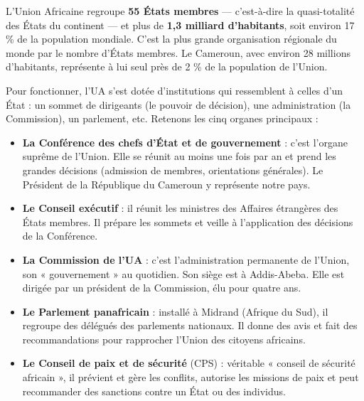 \documentclass[11pt]{article}
\newcommand{\cle}[1]{{\popxbold\color{popdark}#1}}
\newcounter{popsec}
\newcounter{popsub}
\newcommand{\courssub}[1]{%
  \stepcounter{popsub}%
  \par\vspace{9pt}\noindent{\popxbold\fontsize{11.5}{13}\selectfont\color{popink}{\color{poporange}\thepopsec.\thepopsub}\hspace{6pt}#1}\par\nopagebreak\vspace{4pt}
}
\begin{document}
\begin{exemplebox}[L'UA en chiffres]
L'Union Africaine regroupe \textbf{55 États membres} — c'est-à-dire la quasi-totalité des États du continent — et plus de \textbf{1,3 milliard d'habitants}, soit environ 17 \% de la population mondiale. C'est la plus grande organisation régionale du monde par le nombre d'États membres. Le Cameroun, avec environ 28 millions d'habitants, représente à lui seul près de 2 \% de la population de l'Union.
\end{exemplebox}

\courssub{Les organes de l'Union Africaine}

Pour fonctionner, l'UA s'est dotée d'institutions qui ressemblent à celles d'un État : un sommet de dirigeants (le pouvoir de décision), une administration (la Commission), un parlement, etc. Retenons les cinq organes principaux :

\begin{itemize}
\item \textbf{La Conférence des chefs d'État et de gouvernement} : c'est l'organe suprême de l'Union. Elle se réunit au moins une fois par an et prend les grandes décisions (admission de membres, orientations générales). Le Président de la République du Cameroun y représente notre pays.
\item \textbf{Le Conseil exécutif} : il réunit les ministres des Affaires étrangères des États membres. Il prépare les sommets et veille à l'application des décisions de la Conférence.
\item \textbf{La Commission de l'UA} : c'est l'administration permanente de l'Union, son « gouvernement » au quotidien. Son siège est à \cle{Addis-Abeba}. Elle est dirigée par un président de la Commission, élu pour quatre ans.
\item \textbf{Le Parlement panafricain} : installé à Midrand (Afrique du Sud), il regroupe des délégués des parlements nationaux. Il donne des avis et fait des recommandations pour rapprocher l'Union des citoyens africains.
\item \textbf{Le Conseil de paix et de sécurité} (CPS) : véritable « conseil de sécurité africain », il prévient et gère les conflits, autorise les missions de paix et peut recommander des sanctions contre un État ou des individus.
\end{itemize}
\end{document}
